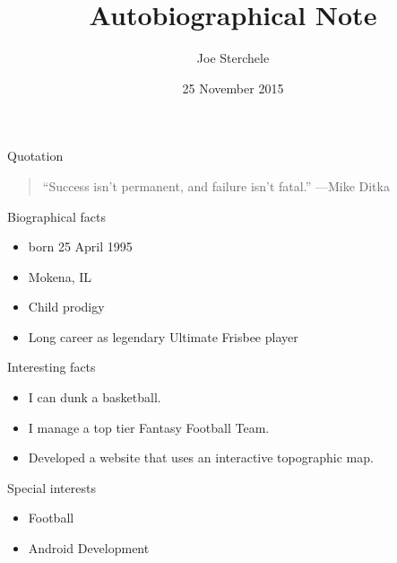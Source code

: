 \documentclass{beamer}
\title{Autobiographical Note}
\author{Joe Sterchele}
\institute{Cornell College}
\date{25 November 2015}
\begin{document}
\begin{frame}
  \titlepage
\end{frame}

\begin{frame}{Quotation}
\begin{quotation}
\noindent
``Success isn't permanent, and failure isn't fatal.''
  \flushright
  ---Mike Ditka
  \end{quotation}
\end{frame}

\begin{frame}{Biographical facts}
\begin{itemize}
  \item born 25 April 1995
  \item Mokena, IL
  \item Child prodigy
  \item Long career as legendary Ultimate Frisbee player
  \end{itemize}
\end{frame}

\begin{frame}{Interesting facts}
\begin{itemize}
  \item I can dunk a basketball.
  \item I manage a top tier Fantasy Football Team.
  \item Developed a website that uses an interactive topographic map. 
  \end{itemize}
\end{frame}

\begin{frame}{Special interests}
\begin{itemize}
  \item Football
  \item Android Development
  \end{itemize}
\end{frame}
\end{document}
